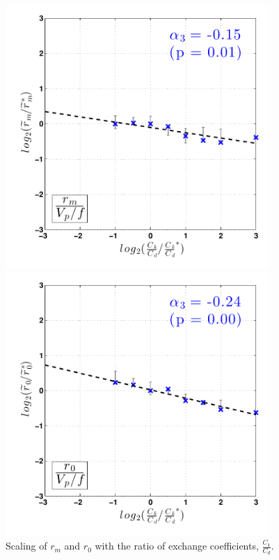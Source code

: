 \documentclass[12pt]{article}
\begin{document}
\begin{figure}[h!]
\centering
  
  \noindent\includegraphics[width=10cm,height=10cm]{FIGURES_TC_RCE_equilibrium_v2.0/Fig8b_CkCd_nondimensional_scaling_rm.pdf}
  
  \noindent\includegraphics[width=10cm,height=10cm]{FIGURES_TC_RCE_equilibrium_v2.0/Fig8c_CkCd_nondimensional_scaling_r0.pdf}

\caption{Scaling of $r_m$ and $r_0$ with the ratio of exchange coefficients, $\frac{C_k}{C_d}$.}
\label{fig:nondimscaling_CkCd_r}
\end{figure}
\end{document}
